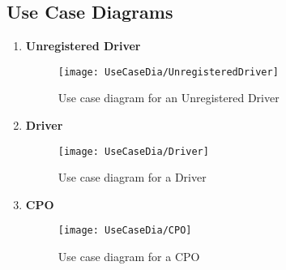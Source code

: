 \subsection{Use Case Diagrams}
\begin{enumerate}
    \item \textbf{Unregistered Driver}
        \begin{figure}[H]
            \begin{center}
            \texttt{[image: UseCaseDia/UnregisteredDriver]}
            \caption{Use case diagram for an Unregistered Driver}
            \label{fig:UnregisteredDriver}
            \end{center}
        \end{figure}
        \newpage
    \item \textbf{Driver}
        \begin{figure}[H]
            \begin{center}
            \texttt{[image: UseCaseDia/Driver]}
            \caption{Use case diagram for a Driver}
            \label{fig:UnregisteredDriver}
            \end{center}
        \end{figure}
    \item \textbf{CPO}
        \begin{figure}[H]
            \begin{center}
            \texttt{[image: UseCaseDia/CPO]}
            \caption{Use case diagram for a CPO}
            \label{fig:UnregisteredDriver}
            \end{center}
        \end{figure}
\end{enumerate}
\label{subsec:useCaseDiagrams}
\newpage
